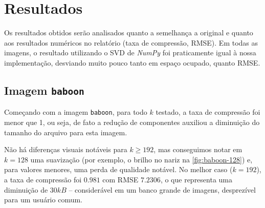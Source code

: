 \documentclass[brazilian,a4paper,twocolumn]{article}
\begin{document}
\section{Resultados}

    Os resultados obtidos serão analisados quanto a semelhança a original e quanto aos resultados numéricos no relatório (taxa de compressão, RMSE).
    Em todas as imagens, o resultado utilizando o SVD de \emph{NumPy} foi praticamente igual à nossa implementação, desviando muito pouco tanto em espaço ocupado, quanto RMSE.

    \subsection{Imagem \texttt{baboon}}

        Começando com a imagem \texttt{baboon}, para todo $k$ testado, a taxa de compressão foi menor que 1, ou seja, de fato a redução de componentes auxiliou a diminuição do tamanho do arquivo para esta imagem.

        Não há diferenças visuais notáveis para $k \geq 192$, mas conseguimos notar em $k = 128$ uma suavização (por exemplo, o brilho no nariz na \cref{fig:baboon-128}) e, para valores menores, uma perda de qualidade notável. No melhor caso ($k = 192$), a taxa de compressão foi $0.981$ com RMSE $7.2306$, o que representa uma diminuição de $30 kB$ -- considerável em um banco grande de imagens, desprezível para um usuário comum.
\end{document}
